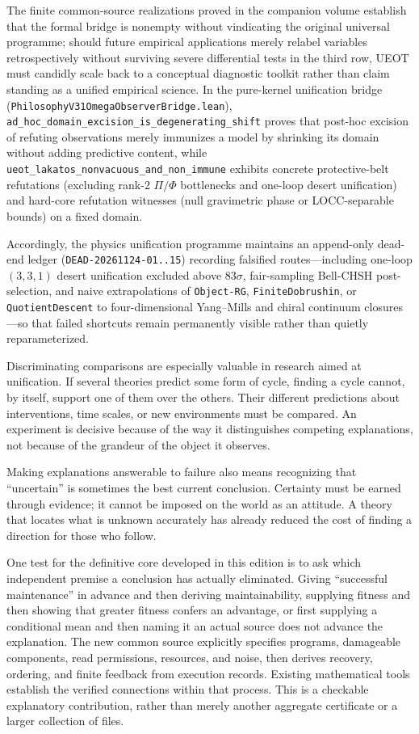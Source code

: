 \documentclass[
  english,
  11pt,
  oneside]{book}
\newcounter{none} %
\begin{document}
The finite common-source realizations proved in the companion volume establish that the formal bridge is nonempty without vindicating the original universal programme; should future empirical applications merely relabel variables retrospectively without surviving severe differential tests in the third row, UEOT must candidly scale back to a conceptual diagnostic toolkit rather than claim standing as a unified empirical science. In the pure-kernel unification bridge (\nolinkurl{PhilosophyV31OmegaObserverBridge.lean}), \nolinkurl{ad_hoc_domain_excision_is_degenerating_shift} proves that post-hoc excision of refuting observations merely immunizes a model by shrinking its domain without adding predictive content, while \nolinkurl{ueot_lakatos_nonvacuous_and_non_immune} exhibits concrete protective-belt refutations (excluding rank-2 \(\Pi/\Phi\) bottlenecks and one-loop desert unification) and hard-core refutation witnesses (null gravimetric phase or LOCC-separable bounds) on a fixed domain.

Accordingly, the physics unification programme maintains an append-only dead-end ledger (\texttt{DEAD-20261124-01..15}) recording falsified routes---including one-loop \((3,3,1)\) desert unification excluded above \(83\sigma\), fair-sampling Bell-CHSH post-selection, and naive extrapolations of \texttt{Object-RG}, \texttt{FiniteDobrushin}, or \texttt{QuotientDescent} to four-dimensional Yang--Mills and chiral continuum closures---so that failed shortcuts remain permanently visible rather than quietly reparameterized.

Discriminating comparisons are especially valuable in research aimed at unification. If several theories predict some form of cycle, finding a cycle cannot, by itself, support one of them over the others. Their different predictions about interventions, time scales, or new environments must be compared. An experiment is decisive because of the way it distinguishes competing explanations, not because of the grandeur of the object it observes.

Making explanations answerable to failure also means recognizing that ``uncertain'' is sometimes the best current conclusion. Certainty must be earned through evidence; it cannot be imposed on the world as an attitude. A theory that locates what is unknown accurately has already reduced the cost of finding a direction for those who follow.

One test for the definitive core developed in this edition is to ask which independent premise a conclusion has actually eliminated. Giving ``successful maintenance'' in advance and then deriving maintainability, supplying fitness and then showing that greater fitness confers an advantage, or first supplying a conditional mean and then naming it an actual source does not advance the explanation. The new common source explicitly specifies programs, damageable components, read permissions, resources, and noise, then derives recovery, ordering, and finite feedback from execution records. Existing mathematical tools establish the verified connections within that process. This is a checkable explanatory contribution, rather than merely another aggregate certificate or a larger collection of files.
\end{document}
